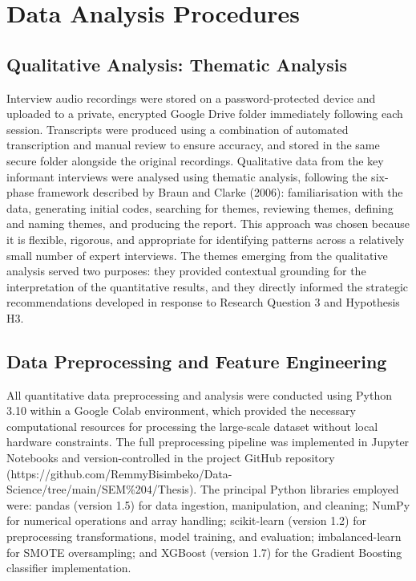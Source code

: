\section{Data Analysis Procedures}


\subsection{Qualitative Analysis: Thematic Analysis}

Interview audio recordings were stored on a password-protected device and uploaded to a private, encrypted Google Drive folder immediately following each session. Transcripts were produced using a combination of automated transcription and manual review to ensure accuracy, and stored in the same secure folder alongside the original recordings. Qualitative data from the key informant interviews were analysed using thematic analysis, following the six-phase framework described by Braun and Clarke (2006): familiarisation with the data, generating initial codes, searching for themes, reviewing themes, defining and naming themes, and producing the report. This approach was chosen because it is flexible, rigorous, and appropriate for identifying patterns across a relatively small number of expert interviews. The themes emerging from the qualitative analysis served two purposes: they provided contextual grounding for the interpretation of the quantitative results, and they directly informed the strategic recommendations developed in response to Research Question 3 and Hypothesis H3.


\subsection{Data Preprocessing and Feature Engineering}

All quantitative data preprocessing and analysis were conducted using Python 3.10 within a Google Colab environment, which provided the necessary computational resources for processing the large-scale dataset without local hardware constraints. The full preprocessing pipeline was implemented in Jupyter Notebooks and version-controlled in the project GitHub repository (https://github.com/RemmyBisimbeko/Data-Science/tree/main/SEM\%204/Thesis). The principal Python libraries employed were: pandas (version 1.5) for data ingestion, manipulation, and cleaning; NumPy for numerical operations and array handling; scikit-learn (version 1.2) for preprocessing transformations, model training, and evaluation; imbalanced-learn for SMOTE oversampling; and XGBoost (version 1.7) for the Gradient Boosting classifier implementation.


